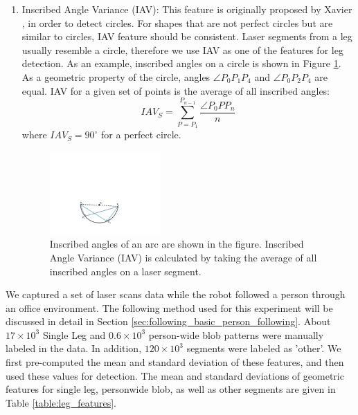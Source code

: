 \begin{enumerate}
\item Inscribed Angle Variance (IAV): This feature is originally proposed by Xavier \cite{xavier2005fast}, in order to detect circles. For shapes that are not perfect circles but are similar to circles, IAV feature should be consistent. Laser segments from a leg usually resemble a circle, therefore we use IAV as one of the features for leg detection. As an example, inscribed angles on a circle is shown in Figure \ref{fig:iav}. As a geometric property of the circle, angles $\angle P_0P_1P_4$ and $\angle P_0P_2P_4$ are equal. IAV for a given set of points is the average of all inscribed angles: 
\[
IAV_S = \sum_{P = P_1}^{P_{n-1}} \dfrac{\angle P_0PP_n}{n}
\]
where $IAV_S=90^{\circ}$ for a perfect circle.

\begin{figure}[ht!]
\centering
\includegraphics[width=0.4\textwidth]{pics/iav}
\caption{Inscribed angles of an arc are shown in the figure. Inscribed Angle Variance (IAV) is calculated by taking the average of all inscribed angles on a laser segment.}
\label{fig:iav}
\end{figure}

\end{enumerate}


We captured a set of laser scans data while the robot followed a person through an office environment. The following method used for this experiment will be discussed in detail in Section \ref{sec:following_basic_person_following}. About $17\times 10^3$ Single Leg and $0.6\times 10^3$ person-wide blob patterns were manually labeled in the data. In addition, $120\times 10^3$ segments were labeled as 'other'. We first pre-computed the mean and standard deviation of these features, and then used these values for detection. The mean and standard deviations of geometric features for single leg, personwide blob, as well as other segments are given in Table \ref{table:leg_features}. 

